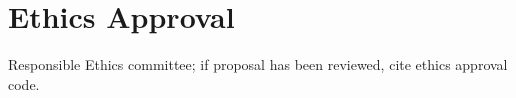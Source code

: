\section*{Ethics Approval}

\begin{prereg}
\begin{instruction}
Responsible Ethics committee; if proposal has been reviewed, cite ethics approval code.
\end{instruction}
\end{prereg}
